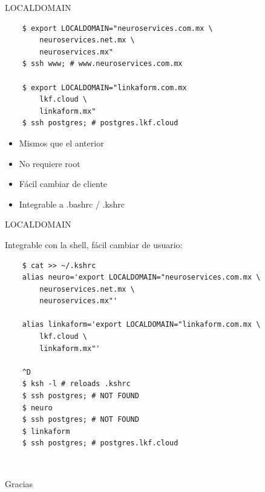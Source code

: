 \documentclass[11pt,spanish]{article}
\newcommand{\rowsp}[1][1em]{\vspace{#1}}
\newcommand{\hone}[1]{{\rowsp[0.3em]\noindent\Large #1 \rowsp[0.3em]}}
\newcommand{\myitm}[1]{\begin{itemize}#1\end{itemize}}
\newcommand{\pros}{\item[pros:]}
\begin{document}
\newpage %

\hone{LOCALDOMAIN}

\begin{lstlisting}
	$ export LOCALDOMAIN="neuroservices.com.mx \
		neuroservices.net.mx \
		neuroservices.mx"
	$ ssh www; # www.neuroservices.com.mx

	$ export LOCALDOMAIN="linkaform.com.mx
		lkf.cloud \
		linkaform.mx"
	$ ssh postgres; # postgres.lkf.cloud
\end{lstlisting}

\myitm{
	\pros Mismos que el anterior
	\pros No requiere root
	\pros Fácil cambiar de cliente
	\pros Integrable a .bashrc / .kshrc
}

\newpage %

\hone{LOCALDOMAIN}

Integrable con la shell, fácil cambiar de usuario:

\begin{lstlisting}
	$ cat >> ~/.kshrc
	alias neuro='export LOCALDOMAIN="neuroservices.com.mx \
		neuroservices.net.mx \
		neuroservices.mx"'

	alias linkaform='export LOCALDOMAIN="linkaform.com.mx \
		lkf.cloud \
		linkaform.mx"'

	^D
	$ ksh -l # reloads .kshrc
	$ ssh postgres; # NOT FOUND
	$ neuro
	$ ssh postgres; # NOT FOUND
	$ linkaform
	$ ssh postgres; # postgres.lkf.cloud
\end{lstlisting}

\newpage %
\ 
\begin{center}
\hone{Gracias}
\end{center}

\label{lastpage}
\end{document}
